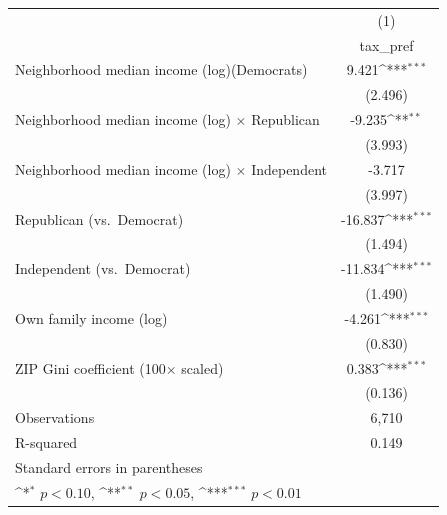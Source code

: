 {
\def\sym#1{\ifmmode^{#1}\else\(^{#1}\)\fi}
\begin{tabular}{l*{1}{c}}
\toprule
            &\multicolumn{1}{c}{(1)}\\
            &\multicolumn{1}{c}{tax\_pref}\\
\midrule
Neighborhood median income (log)(Democrats)&       9.421\sym{***}\\
            &     (2.496)         \\
Neighborhood median income (log) $\times$ Republican&      -9.235\sym{**} \\
            &     (3.993)         \\
Neighborhood median income (log) $\times$ Independent&      -3.717         \\
            &     (3.997)         \\
Republican (vs.\ Democrat)&     -16.837\sym{***}\\
            &     (1.494)         \\
Independent (vs.\ Democrat)&     -11.834\sym{***}\\
            &     (1.490)         \\
Own family income (log)&      -4.261\sym{***}\\
            &     (0.830)         \\
ZIP Gini coefficient (100$\times$ scaled)&       0.383\sym{***}\\
            &     (0.136)         \\
\midrule
Observations&       6,710         \\
R-squared   &       0.149         \\
\bottomrule
\multicolumn{2}{l}{\footnotesize Standard errors in parentheses}\\
\multicolumn{2}{l}{\footnotesize \sym{*} \(p<0.10\), \sym{**} \(p<0.05\), \sym{***} \(p<0.01\)}\\
\end{tabular}
}
